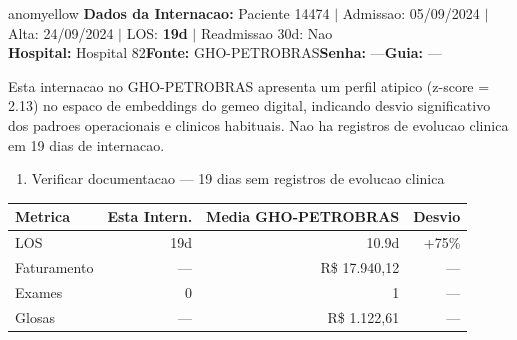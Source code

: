 \documentclass[a4paper,10pt]{article}
\begin{document}
\begin{anomalycard}[Internacao 105631 | GHO-PETROBRAS | MODERADO (z=2.13)]{anomyellow}
\textbf{Dados da Internacao:} Paciente 14474 $\mid$ Admissao: 05/09/2024 $\mid$ Alta: 24/09/2024 $\mid$ LOS: \textbf{19d} $\mid$ Readmissao 30d: Nao\\
\textbf{Hospital:} Hospital 82\quad\textbf{Fonte:} GHO-PETROBRAS\quad\textbf{Senha:} ---\quad\textbf{Guia:} ---\\
\vspace{2pt}\begin{tcolorbox}[colback=severityred!20,colframe=anomyellow,title={\textbf{Interpretacao de Negocio}},fonttitle=\bfseries\small,left=4pt,right=4pt,top=3pt,bottom=3pt]
{\small Esta internacao no GHO-PETROBRAS apresenta um perfil atipico (z-score = 2.13) no espaco de embeddings do gemeo digital, indicando desvio significativo dos padroes operacionais e clinicos habituais. Nao ha registros de evolucao clinica em 19 dias de internacao.}
\end{tcolorbox}
\begin{tcolorbox}[colback=severityyellow!30,colframe=anomorange,title={\textbf{Recomendacoes Especificas}},fonttitle=\bfseries\small,left=4pt,right=4pt,top=3pt,bottom=3pt]
\begin{enumerate}[nosep,leftmargin=16pt]
\item {\small Verificar documentacao --- 19 dias sem registros de evolucao clinica}
\end{enumerate}
\end{tcolorbox}
\begin{center}\begin{tabular}{l r r r}\toprule\textbf{Metrica} & \textbf{Esta Intern.} & \textbf{Media GHO-PETROBRAS} & \textbf{Desvio} \\\midrule
LOS & 19d & 10.9d & \textcolor{anomorange}{+75\%} \\
Faturamento & --- & R\$ 17.940,12 & --- \\
Exames & 0 & 1 & --- \\
Glosas & --- & R\$ 1.122,61 & --- \\
\bottomrule\end{tabular}\end{center}


\end{anomalycard}
\end{document}
